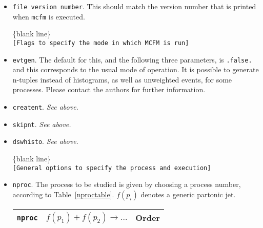 \documentclass[12pt]{article}
\begin{document}
\begin{itemize}
\item {\tt file version number}. This should match the version number
that is printed when {\tt mcfm} is executed.

\begin{center}
\{blank line\} \\
{\tt [Flags to specify the mode in which MCFM is run] }
\end{center}

\item {\tt evtgen}. The default for this, and the following three
parameters, is {\tt .false.} and this corresponds to the usual mode
of operation. It is possible to generate n-tuples instead of histograms,
as well as unweighted events, for some processes. Please contact the
authors for further information.
\item {\tt creatent}. {\it See above.}
\item {\tt skipnt}. {\it See above.}
\item {\tt dswhisto}. {\it See above.}

\begin{center}
\{blank line\} \\
{\tt [General options to specify the process and execution] }
\end{center}

\item {\tt nproc}.
The process to be studied is given by
choosing a process number, according to Table~\ref{nproctable}.
$f(p_i)$ denotes a generic partonic jet.

\begin{table}
\begin{center}
\hspace*{-1.5cm}
\begin{tabular}{|l|l|l|}
\hline
{\tt nproc} & $f(p_1)+f(p_2) \to \ldots $& Order \\
\hline
 

\end{tabular}
\end{center}
\end{table}
\end{itemize}
\end{document}
